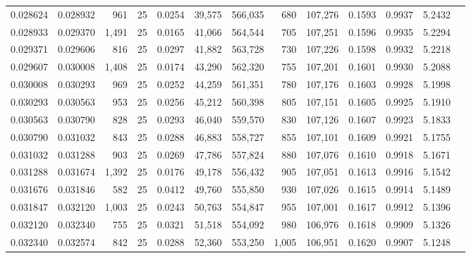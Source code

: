\begin{tabular}{rrrrrrrrrrrrr}
0.028624 & 0.028932 &   961 &  25 &                                     0.0254 &  39,575 & 566,035 &     680 & 107,276 & 0.1593 & 0.9937 & 5.2432 \\
0.028933 & 0.029370 & 1,491 &  25 &                                     0.0165 &  41,066 & 564,544 &     705 & 107,251 & 0.1596 & 0.9935 & 5.2294 \\
0.029371 & 0.029606 &   816 &  25 &                                     0.0297 &  41,882 & 563,728 &     730 & 107,226 & 0.1598 & 0.9932 & 5.2218 \\
0.029607 & 0.030008 & 1,408 &  25 &                                     0.0174 &  43,290 & 562,320 &     755 & 107,201 & 0.1601 & 0.9930 & 5.2088 \\
0.030008 & 0.030293 &   969 &  25 &                                     0.0252 &  44,259 & 561,351 &     780 & 107,176 & 0.1603 & 0.9928 & 5.1998 \\
0.030293 & 0.030563 &   953 &  25 &                                     0.0256 &  45,212 & 560,398 &     805 & 107,151 & 0.1605 & 0.9925 & 5.1910 \\
0.030563 & 0.030790 &   828 &  25 &                                     0.0293 &  46,040 & 559,570 &     830 & 107,126 & 0.1607 & 0.9923 & 5.1833 \\
0.030790 & 0.031032 &   843 &  25 &                                     0.0288 &  46,883 & 558,727 &     855 & 107,101 & 0.1609 & 0.9921 & 5.1755 \\
0.031032 & 0.031288 &   903 &  25 &                                     0.0269 &  47,786 & 557,824 &     880 & 107,076 & 0.1610 & 0.9918 & 5.1671 \\
0.031288 & 0.031674 & 1,392 &  25 &                                     0.0176 &  49,178 & 556,432 &     905 & 107,051 & 0.1613 & 0.9916 & 5.1542 \\
0.031676 & 0.031846 &   582 &  25 &                                     0.0412 &  49,760 & 555,850 &     930 & 107,026 & 0.1615 & 0.9914 & 5.1489 \\
0.031847 & 0.032120 & 1,003 &  25 &                                     0.0243 &  50,763 & 554,847 &     955 & 107,001 & 0.1617 & 0.9912 & 5.1396 \\
0.032120 & 0.032340 &   755 &  25 &                                     0.0321 &  51,518 & 554,092 &     980 & 106,976 & 0.1618 & 0.9909 & 5.1326 \\
0.032340 & 0.032574 &   842 &  25 &                                     0.0288 &  52,360 & 553,250 &   1,005 & 106,951 & 0.1620 & 0.9907 & 5.1248 \\

\end{tabular}
